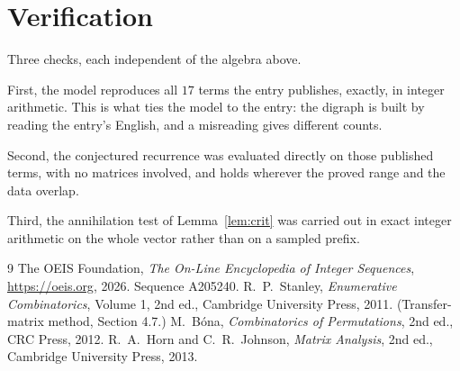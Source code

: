 \documentclass[11pt,a4paper]{article}
\theoremstyle{plain}
\theoremstyle{definition}
\begin{document}
\section{Verification}

Three checks, each independent of the algebra above.

First, the model reproduces all $17$ terms the entry publishes, exactly, in integer
arithmetic. This is what ties the model to the entry: the digraph is built by reading the
entry's English, and a misreading gives different counts.

Second, the conjectured recurrence was evaluated directly on those published terms, with no
matrices involved, and holds wherever the proved range and the data overlap.

Third, the annihilation test of Lemma~\ref{lem:crit} was carried out in exact integer
arithmetic on the whole vector rather than on a sampled prefix.

\begin{thebibliography}{9}
 The OEIS Foundation, \emph{The On-Line Encyclopedia of Integer
Sequences}, \url{https://oeis.org}, 2026. Sequence A205240.
 R.~P.~Stanley, \emph{Enumerative Combinatorics}, Volume 1, 2nd ed.,
Cambridge University Press, 2011. (Transfer-matrix method, Section 4.7.)
 M.~B\'ona, \emph{Combinatorics of Permutations}, 2nd ed., CRC
Press, 2012.
 R.~A.~Horn and C.~R.~Johnson, \emph{Matrix Analysis}, 2nd ed., Cambridge
University Press, 2013.
\end{thebibliography}
\end{document}
